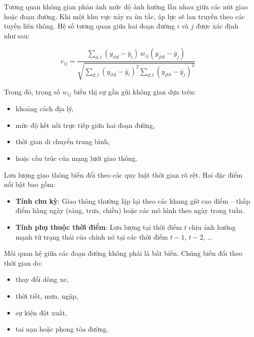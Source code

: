 
Tương quan không gian phản ánh mức độ ảnh hưởng lẫn nhau giữa các nút giao hoặc đoạn đường. Khi một khu vực xảy ra ùn tắc, áp lực sẽ lan truyền theo các tuyến liên thông. Hệ số tương quan giữa hai đoạn đường $i$ và $j$ được xác định như sau:

\begin{equation}
r_{ij} = \frac{\sum_{d,t}(y_{itd}-\bar{y}_i)\, w_{ij}(y_{jtd}-\bar{y}_j)}{\sqrt{\sum_{d,t}(y_{itd}-\bar{y}_i)^2 \sum_{d,t}(y_{jtd}-\bar{y}_j)^2}}
\end{equation}

Trong đó, trọng số $w_{ij}$ biểu thị sự gần gũi không gian dựa trên:
\begin{itemize}
    \item khoảng cách địa lý,
    \item mức độ kết nối trực tiếp giữa hai đoạn đường,
    \item thời gian di chuyển trung bình,
    \item hoặc cấu trúc của mạng lưới giao thông.
\end{itemize}


Lưu lượng giao thông biến đổi theo các quy luật thời gian rõ rệt. Hai đặc điểm nổi bật bao gồm:

\begin{itemize}
    \item \textbf{Tính chu kỳ}:  
    Giao thông thường lặp lại theo các khung giờ cao điểm -- thấp điểm hàng ngày (sáng, trưa, chiều) hoặc các mô hình theo ngày trong tuần.
    
    \item \textbf{Tính phụ thuộc thời điểm}:  
    Lưu lượng tại thời điểm $t$ chịu ảnh hưởng mạnh từ trạng thái của chính nó tại các thời điểm $t-1$, $t-2$, …
\end{itemize}


Mối quan hệ giữa các đoạn đường không phải là bất biến. Chúng biến đổi theo thời gian do:
\begin{itemize}
    \item thay đổi dòng xe,
    \item thời tiết, mưa, ngập,
    \item sự kiện đột xuất,
    \item tai nạn hoặc phong tỏa đường.
\end{itemize}

